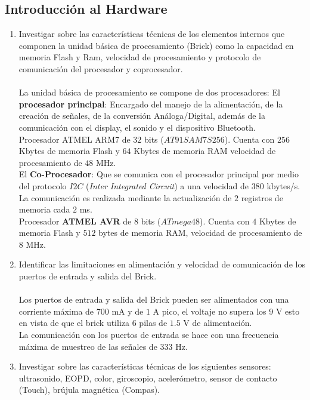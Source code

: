 \documentclass[twocolumn]{IEEEtran}
\begin{document}
\subsection{Introducción al Hardware}
\begin{enumerate}
 \item Investigar sobre las características técnicas de los elementos internos que componen la unidad básica de procesamiento (Brick) como la capacidad en memoria Flash y Ram, velocidad de procesamiento y protocolo de comunicación del procesador y coprocesador.\\\\
La unidad básica de procesamiento se compone de dos procesadores:
El \textbf{procesador principal}: Encargado del manejo de la alimentación, de la creación de señales, de la  conversión Análoga/Digital, además de la comunicación con el display, el sonido y el dispositivo Bluetooth.\\
Procesador ATMEL ARM7 de $32$ bits ($AT91SAM7S256$). Cuenta con $256$ Kbytes de memoria Flash y $64$ Kbytes de memoria RAM velocidad de procesamiento de $48$ MHz.\\
El \textbf{Co-Procesador}: Que se comunica con el procesador principal  por medio del protocolo $I2C$ (\textit{Inter Integrated Circuit}) a una velocidad de $380$  kbytes/s.  La comunicación es realizada mediante la actualización de $2$ registros de memoria cada $2$ ms.\\
Procesador \textbf{ATMEL AVR} de $8$ bits ($ATmega48$). Cuenta con $4$ Kbytes de memoria Flash y $512$ bytes de memoria RAM, velocidad de procesamiento de $8$ MHz.\\
\item Identificar las limitaciones en alimentación y velocidad de comunicación de los puertos de entrada y salida del Brick.\\\\
Los puertos de entrada y salida del Brick pueden ser alimentados con una corriente máxima de $700$ mA y de $1$ A pico, el voltaje no supera los $9$ V esto en vista de que el brick utiliza $6$ pilas de $1.5$ V de alimentación.\\
La comunicación con los puertos de entrada se hace con una frecuencia máxima de muestreo de las señales de $333$ Hz.\\
\item  Investigar sobre las características técnicas de los siguientes sensores: ultrasonido, EOPD, color, giroscopio, acelerómetro, sensor de contacto (Touch), brújula magnética (Compas).\\\\

\end{enumerate}
\end{document}
